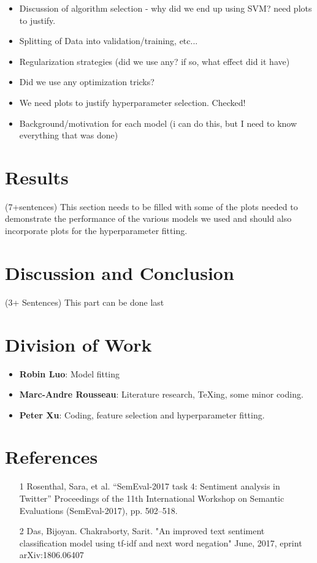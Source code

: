 \documentclass{amsart}
\theoremstyle{definition}
\theoremstyle{remark}
\numberwithin{equation}{section}
\begin{document}
\begin{itemize}
	\item Discussion of algorithm selection - why did we end up using SVM?  need plots to justify.
	\item Splitting of Data into validation/training, etc...
	\item Regularization strategies (did we use any?  if so, what effect did it have)
	\item Did we use any optimization tricks?
	\item We need plots to justify hyperparameter selection. Checked!
	\item Background/motivation for each model (i can do this, but I need to know everything that was done)
\end{itemize}
\section{Results} (7+sentences)
This section needs to be filled with some of the plots needed to demonstrate the performance of the various models we used and should also incorporate plots for the hyperparameter fitting.
\section{Discussion and Conclusion}(3+ Sentences)
This part can be done last
\section{Division of Work}
\begin{itemize}
\item{\textbf{Robin Luo}}: Model fitting 
\item{\textbf{Marc-Andre Rousseau}}: Literature research, TeXing, some minor coding.
\item{\textbf{Peter Xu}}: Coding, feature selection and hyperparameter fitting.
\end{itemize}
\section{References}
\begin{itemize}
	\item [1] Rosenthal, Sara, et al. “SemEval-2017 task 4: Sentiment analysis in Twitter” Proceedings of the 11th International Workshop on Semantic Evaluations (SemEval-2017), pp. 502–518.
	\item [2] Das, Bijoyan. Chakraborty, Sarit. "An improved text sentiment classification model using tf-idf and next word negation" June, 2017, eprint arXiv:1806.06407
\end{itemize}
\end{document}
